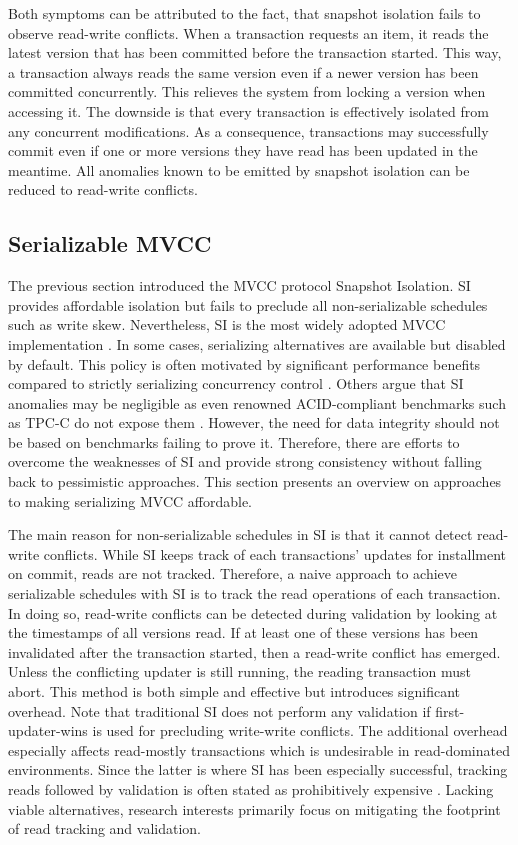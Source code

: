 Both symptoms can be attributed to the fact, that snapshot isolation fails to
observe read-write conflicts. When a transaction requests an item, it reads the
latest version that has been committed before the transaction started. This way,
a transaction always reads the same version even if a newer version has been
committed concurrently. This relieves the system from locking a version when
accessing it. The downside is that every transaction is effectively isolated
from any concurrent modifications. As a consequence, transactions may
successfully commit even if one or more versions they have read has been updated
in the meantime. All anomalies known to be emitted by snapshot isolation can be
reduced to read-write conflicts.

\subsection{Serializable MVCC}

The previous section introduced the MVCC protocol Snapshot Isolation. SI
provides affordable isolation but fails to preclude all non-serializable
schedules such as write skew. Nevertheless, SI is the most widely adopted MVCC
implementation \cite{larson2011high, bailey2013exploring, neumann2015fast}. In
some cases, serializing alternatives are available but disabled by default. This
policy is often motivated by significant performance benefits compared to
strictly serializing concurrency control \cite{cahill2009serializable}. Others
argue that SI anomalies may be negligible as even renowned ACID-compliant
benchmarks such as TPC-C do not expose them \cite{fekete2005making}. However,
the need for data integrity should not be based on benchmarks failing to prove
it. Therefore, there are efforts to overcome the weaknesses of SI and provide
strong consistency without falling back to pessimistic approaches. This section
presents an overview on approaches to making serializing MVCC affordable.

The main reason for non-serializable schedules in SI is that it cannot detect
read-write conflicts. While SI keeps track of each transactions' updates for
installment on commit, reads are not tracked. Therefore, a naive approach to
achieve serializable schedules with SI is to track the read operations of each
transaction. In doing so, read-write conflicts can be detected during validation
by looking at the timestamps of all versions read. If at least one of these
versions has been invalidated after the transaction started, then a read-write
conflict has emerged. Unless the conflicting updater is still running, the
reading transaction must abort. This method is both simple and effective but
introduces significant overhead. Note that traditional SI does not perform any
validation if first-updater-wins is used for precluding write-write conflicts.
The additional overhead especially affects read-mostly transactions which is
undesirable in read-dominated environments. Since the latter is where SI has
been especially successful, tracking reads followed by validation is often
stated as prohibitively expensive \cite{cahill2009serializable}. Lacking viable
alternatives, research interests primarily focus on mitigating the footprint of
read tracking and validation.

